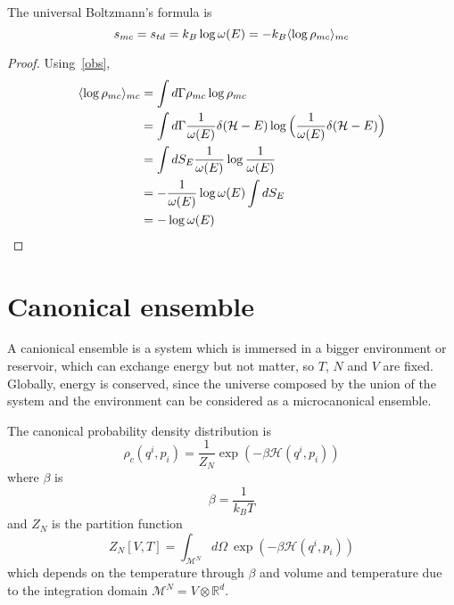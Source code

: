     The universal Boltzmann's formula is 
    \begin{equation*}
        s_{mc} = s_{td} = k_B \log \omega(E) = - k_B \langle\log \rho_{mc}\rangle_{mc}
    \end{equation*}

    \begin{proof}
        
    Using~\eqref{obs}, 
    \begin{equation*}
    \begin{aligned}
        \langle\log \rho_{mc}\rangle_{mc} & = \int d\Gamma \rho_{mc} \log \rho_{mc} \\ & = \int d\Gamma \frac{1}{\omega(E)} \delta (\mathcal H - E) \log \Big ( \frac{1}{\omega(E)} \delta (\mathcal H - E) \Big) \\ & = \int dS_E \frac{1}{\omega(E)} \log \frac{1}{\omega(E)} \\ & = - \frac{1}{\omega(E)} \log \omega(E) \int dS_E \\ & = - \log \omega (E)
    \end{aligned}
    \end{equation*}
    \end{proof}



\chapter{Canonical ensemble}

    A canionical ensemble is a system which is immersed in a bigger environment or reservoir, which can exchange energy but not matter, so $T$, $N$ and $V$ are fixed. Globally, energy is conserved, since the universe composed by the union of the system and the environment can be considered as a microcanonical ensemble. 

    The canonical probability density distribution is 
    \begin{equation*}
        \rho_c (q^i, p_i) = \frac{1}{Z_N} \exp (-\beta \mathcal H(q^i, p_i))
    \end{equation*}
    where $\beta$ is 
    \begin{equation*}
        \beta = \frac{1}{k_B T}
    \end{equation*}
    and $Z_N$ is the partition function 
    \begin{equation}
        Z_N[V, T] = \int_{\mathcal M^N} d\Omega ~\exp (-\beta \mathcal H(q^i, p_i))
    \end{equation}
    which depends on the temperature through $\beta$ and volume and temperature due to the integration domain $\mathcal M^N = V \otimes \mathbb R^d$.

